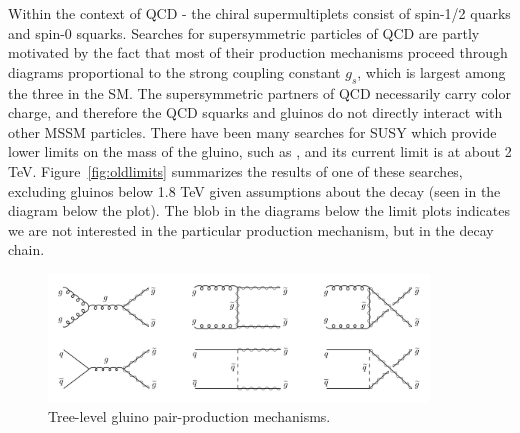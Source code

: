 Within the context of QCD - the chiral supermultiplets consist of spin-1/2 quarks and spin-0 squarks. Searches for supersymmetric particles of QCD are partly motivated by the fact that most of their production mechanisms proceed through diagrams proportional to the strong coupling constant $g_{s}$, which is largest among the three in the SM. The supersymmetric partners of QCD necessarily carry color charge, and therefore the QCD squarks and gluinos do not directly interact with other MSSM particles. There have been many searches for SUSY which provide lower limits on the mass of the gluino, such as \cite{CMS-SUS-16-033, CMS-SUS-15-002}, and its current limit is at about 2 TeV. Figure~\ref{fig:oldlimits} summarizes the results of one of these searches, excluding gluinos below 1.8 TeV given assumptions about the decay (seen in the diagram below the plot). The blob in the diagrams below the limit plots indicates we are not interested in the particular production mechanism, but in the decay chain.

\begin{figure}[hbp!]
\centering
\includegraphics[width=0.9\textwidth]{figs/gluinopair}
\caption{Tree-level gluino pair-production mechanisms.}
\label{fig:gluinopair}
\end{figure}

